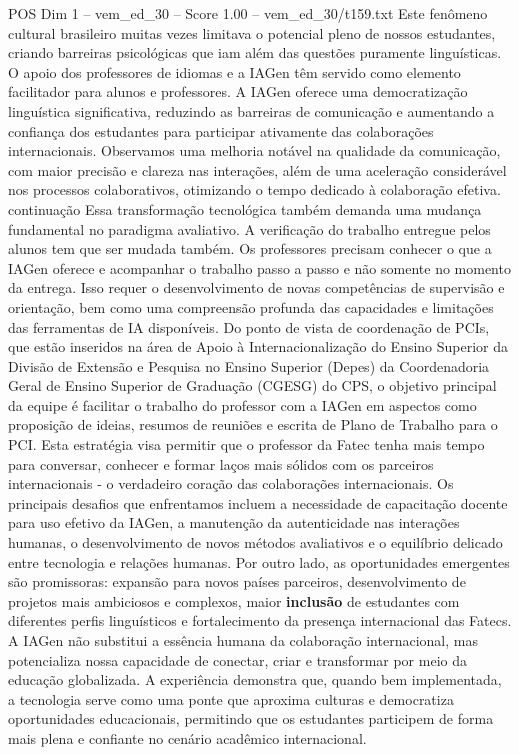 \begin{textsample}{POS Dim 1 – vem\_ed\_30 – Score 1.00 – vem\_ed\_30/t159.txt}
Este fenômeno cultural brasileiro muitas vezes limitava o potencial pleno de nossos estudantes, criando barreiras psicológicas que iam além das questões puramente linguísticas.
O apoio dos professores de idiomas e a IAGen têm servido como elemento facilitador para alunos e professores.
A IAGen oferece uma democratização linguística significativa, reduzindo as barreiras de comunicação e aumentando a confiança dos estudantes para participar ativamente das colaborações internacionais.
Observamos uma melhoria notável na qualidade da comunicação, com maior precisão e clareza nas interações, além de uma aceleração considerável nos processos colaborativos, otimizando o tempo dedicado à colaboração efetiva. continuação Essa transformação tecnológica também demanda uma mudança fundamental no paradigma avaliativo.
A verificação do trabalho entregue pelos alunos tem que ser mudada também.
Os professores precisam conhecer o que a IAGen oferece e acompanhar o trabalho passo a passo e não somente no momento da entrega.
Isso requer o desenvolvimento de novas competências de supervisão e orientação, bem como uma compreensão profunda das capacidades e limitações das ferramentas de IA disponíveis.
Do ponto de vista de coordenação de PCIs, que estão inseridos na área de Apoio à Internacionalização do Ensino Superior da Divisão de Extensão e Pesquisa no Ensino Superior (Depes) da Coordenadoria Geral de Ensino Superior de Graduação (CGESG) do CPS, o objetivo principal da equipe é facilitar o trabalho do professor com a IAGen em aspectos como proposição de ideias, resumos de reuniões e escrita de Plano de Trabalho para o PCI.
Esta estratégia visa permitir que o professor da Fatec tenha mais tempo para conversar, conhecer e formar laços mais sólidos com os parceiros internacionais - o verdadeiro coração das colaborações internacionais.
Os principais desafios que enfrentamos incluem a necessidade de capacitação docente para uso efetivo da IAGen, a manutenção da autenticidade nas interações humanas, o desenvolvimento de novos métodos avaliativos e o equilíbrio delicado entre tecnologia e relações humanas.
Por outro lado, as oportunidades emergentes são promissoras: expansão para novos países parceiros, desenvolvimento de projetos mais ambiciosos e complexos, maior \textbf{inclusão} de estudantes com diferentes perfis linguísticos e fortalecimento da presença internacional das Fatecs.
A IAGen não substitui a essência humana da colaboração internacional, mas potencializa nossa capacidade de conectar, criar e transformar por meio da educação globalizada.
A experiência demonstra que, quando bem implementada, a tecnologia serve como uma ponte que aproxima culturas e democratiza oportunidades educacionais, permitindo que os estudantes participem de forma mais plena e confiante no cenário acadêmico internacional.

\end{textsample}
